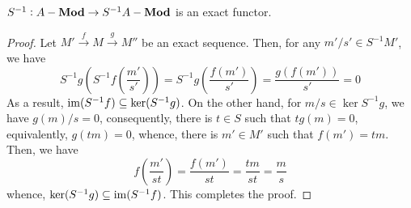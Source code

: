 \begin{theorem}
    $S^{-1}:A-\mathbf{Mod}\to S^{-1}A-\mathbf{Mod}$ is an exact functor.
\end{theorem}
\begin{proof}
    Let $M'\stackrel{f}{\longrightarrow}M\stackrel{g}{\longrightarrow}M''$ be an exact sequence. Then, for any $m'/s'\in S^{-1}M'$, we have 
    \begin{equation*}
        S^{-1}g\left(S^{-1}f\left(\frac{m'}{s'}\right)\right) = S^{-1}g\left(\frac{f(m')}{s'}\right) = \frac{g(f(m'))}{s'} = 0
    \end{equation*}
    As a result, $\operatorname{im}(S^{-1}f)\subseteq\ker(S^{-1}g)$. On the other hand, for $m/s\in\ker S^{-1}g$, we have $g(m)/s = 0$, consequently, there is $t\in S$ such that $tg(m) = 0$, equivalently, $g(tm) = 0$, whence, there is $m'\in M'$ such that $f(m') = tm$. Then, we have 
    \begin{equation*}
        f\left(\frac{m'}{st}\right) = \frac{f(m')}{st} = \frac{tm}{st} = \frac{m}{s}
    \end{equation*}
    whence, $\ker(S^{-1}g)\subseteq\operatorname{im}(S^{-1}f)$. This completes the proof.
\end{proof}

